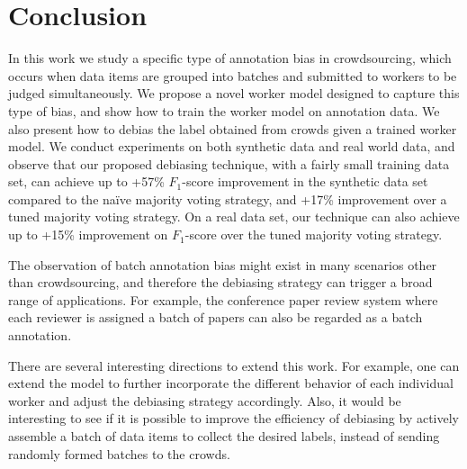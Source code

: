 \section{Conclusion}
\label{sec:conclusion}

In this work we study a specific type of annotation bias in crowdsourcing, 
which occurs when data items are grouped into batches 
and submitted to workers to be judged simultaneously.  
We propose a novel worker model designed to capture this type of bias, 
and show how to train the worker model on annotation data.  
We also present how to debias the label obtained from crowds given a trained worker model.  
We conduct experiments on both synthetic data and real world data, %
and observe that our proposed debiasing technique, 
with a fairly small training data set, 
can achieve up to +57\% $F_1$-score improvement in the synthetic data set 
compared to the na\"{i}ve majority voting strategy, 
and +17\% improvement over a tuned majority voting strategy.   
On a real data set, our technique can also achieve up to +15\% improvement on $F_1$-score
over the tuned majority voting strategy.  


The observation of batch annotation bias might exist in many scenarios other than crowdsourcing, 
and therefore the debiasing strategy can trigger a broad range of applications. 
For example, the conference paper review system where each reviewer is assigned a batch of papers 
can also be regarded as a batch annotation.  

There are several interesting directions to extend this work.  
For example, one can extend the model to further incorporate the different behavior of each individual worker  
and adjust the debiasing strategy accordingly.  
Also, it would be interesting to see if it is possible to improve the efficiency of debiasing 
by actively assemble a batch of data items to collect the desired labels, 
instead of sending randomly formed batches to the crowds.  


